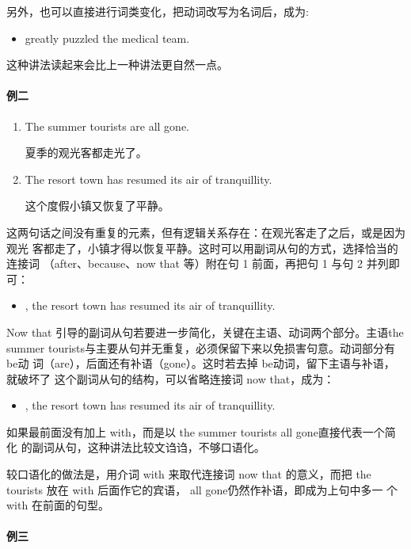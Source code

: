 另外，也可以直接进行词类变化，把动词改写为名词后，成为:
\begin{itemize}
\item {} greatly
  puzzled the medical team.
\end{itemize}

这种讲法读起来会比上一种讲法更自然一点。

\paragraph{例二}

\begin{enumerate}
\item The summer tourists are all gone.

  夏季的观光客都走光了。
\item The resort town has resumed its air of tranquillity.

  这个度假小镇又恢复了平静。
\end{enumerate}

这两句话之间没有重复的元素，但有逻辑关系存在：在观光客走了之后，或是因为观光
客都走了，小镇才得以恢复平静。这时可以用副词从句的方式，选择恰当的连接词
（after、because、now that 等）附在句 1 前面，再把句 1 与句 2 并列即可：
\begin{itemize}
\item {}, the resort town has
  resumed its air of tranquillity.
\end{itemize}
Now that 引导的副词从句若要进一步简化，关键在主语、动词两个部分。主语the
summer tourists与主要从句并无重复，必须保留下来以免损害句意。动词部分有 be动
词（are），后面还有补语（gone）。这时若去掉 be动词，留下主语与补语，就破坏了
这个副词从句的结构，可以省略连接词 now that，成为：
\begin{itemize}
\item {}, the resort town has resumed its air of tranquillity.
\end{itemize}
如果最前面没有加上 with，而是以 the summer tourists all gone直接代表一个简化
的副词从句，这种讲法比较文诌诌，不够口语化。

较口语化的做法是，用介词 with 来取代连接词 now that 的意义，而把 the
tourists 放在 with 后面作它的宾语， all gone仍然作补语，即成为上句中多一
个 with 在前面的句型。

\paragraph{例三}

